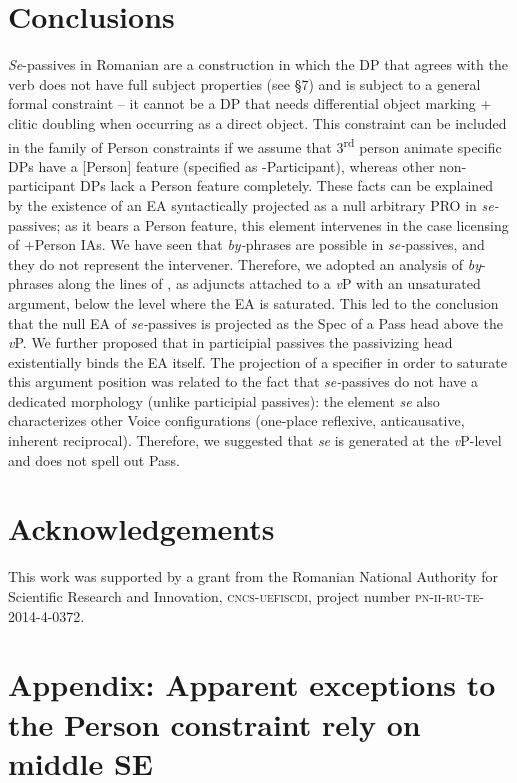 \documentclass[output=paper]{langsci/langscibook}
\begin{document}
\section{Conclusions}%
\textit{Se}{}-passives in Romanian are a construction in which the DP that agrees with the verb does not have full subject properties (see §7) and is subject to a general formal constraint – it cannot be a DP that needs differential object marking + clitic doubling when occurring as a direct object. This constraint can be included in the family of Person constraints if we assume that 3\textsuperscript{rd} person animate specific DPs have a [Person] feature (specified as -Participant), whereas other non-participant DPs lack a Person feature completely. These facts can be explained by the existence of an EA syntactically projected as a null arbitrary PRO in \textit{se-}passives; as it bears a Person feature, this element intervenes in the case licensing of +Person IAs. We have seen that \textit{by-}phrases are possible in \textit{se-}passives, and they do not represent the intervener. Therefore, we adopted an analysis of \textit{by}{}-phrases along the lines of \citet{Bruening2012}, as adjuncts attached to a \textit{v}P with an unsaturated argument, below the level where the EA is saturated. This led to the conclusion that the null EA of \textit{se-}passives is projected as the Spec of a Pass head above the \textit{v}P. We further proposed that in participial passives the passivizing head existentially binds the EA itself. The projection of a specifier in order to saturate this argument position was related to the fact that \textit{se-}passives do not have a dedicated morphology (unlike participial passives): the element \textit{se} also characterizes other Voice configurations (one-place reflexive, anticausative, inherent reciprocal). Therefore, we suggested that \textit{se} is generated at the \textit{v}P-level and does not spell out Pass.
 
\section*{Acknowledgements}
This work was supported by a grant from the Romanian National Authority for Scientific Research and Innovation, \textsc{cncs-uefiscdi}, project number \textsc{pn-ii-ru-te-2014-4-0372}. 

\section*{Appendix: Apparent exceptions to the Person constraint rely on middle SE}
\end{document}
